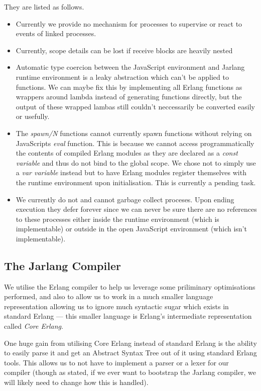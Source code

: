 \documentclass[twoside,12pt,titlepage,a4paper]{article}
\begin{document}
They are listed as follows.

\begin{itemize}
	\item Currently we provide no mechanism for processes to supervise or react to events of linked processes.
	\item Currently, scope details can be lost if receive blocks are heavily nested
	\item Automatic type coercion between the JavaScript environment and Jarlang runtime environment is a leaky abstraction which can't be applied to functions. We can maybe fix this by implementing all Erlang functions as wrappers around lambda instead of generating functions directly, but the output of these wrapped lambas still couldn't neccessarily be converted easily or usefully.
	\item The \textit{spawn/N} functions cannot currently spawn functions without relying on JavaScripts \textit{eval} function. This is because we cannot access programmatically the contents of compiled Erlang modules as they are declared as a \textit{const variable} and thus do not bind to the global scope. We chose not to simply use a \textit{var variable} instead but to have Erlang modules register themselves with the runtime environment upon initialisation. This is currently a pending task.
	\item We currently do not and cannot garbage collect proceses. Upon ending execution they defer forever since we can never be sure there are no references to these processes either inside the runtime environment (which is implementable) or outside in the open JavaScript environment (which isn't implementable).
\end{itemize}

\subsection{The Jarlang Compiler}
We utilise the Erlang compiler to help us leverage some priliminary optimisations performed, and also to allow us to work in a much smaller language representation allowing us to ignore much syntactic sugar which exists in standard Erlang --- this smaller language is Erlang's intermediate representation called \textit{Core Erlang}.

One huge gain from utilising Core Erlang instead of standard Erlang is the ability to easily parse it and get an Abstract Syntax Tree out of it using standard Erlang tools. This allows us to not have to implement a parser or a lexer for our compiler (though as stated, if we ever want to bootstrap the Jarlang compiler, we will likely need to change how this is handled).
\end{document}
